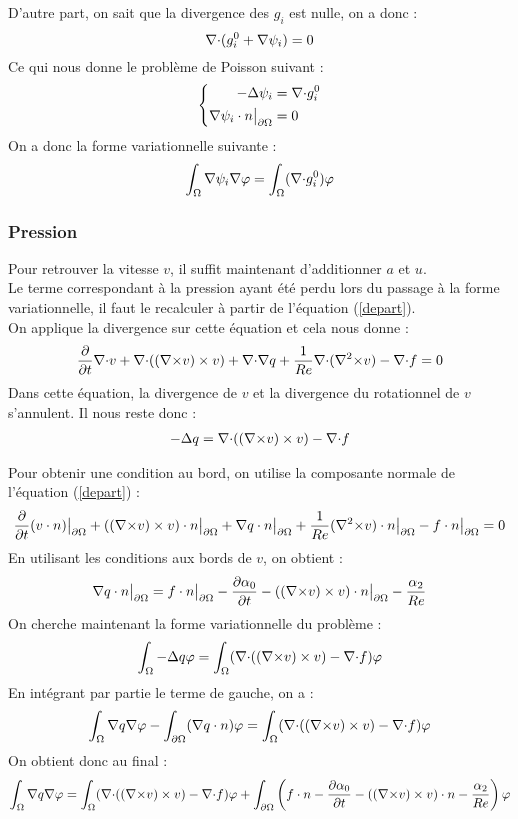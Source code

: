 D'autre part, on sait que la divergence des $g_i$ est nulle, on a donc :
\[
{\nabla\cdot} (g_i^0+{\nabla}\psi_i)=0
\]
Ce qui nous donne le problème de Poisson suivant :
\begin{eqnarray}
\label{psi}
\left\{
\begin{aligned}
-{\Delta}\psi_i &= {\nabla\cdot} g_i^0\\
{\nabla}\psi_i\cdot n{\big\rvert_{\partial\Omega}} &= 0
\end{aligned}
\right.
\end{eqnarray}
On a donc la forme variationnelle suivante :
\begin{eqnarray}
\label{fvpsii}
\int_\Omega {\nabla}\psi_i{\nabla}\varphi = \int_\Omega ({\nabla\cdot} g_i^0)\varphi
\end{eqnarray}

\subsubsection{Pression}
\label{pression}

Pour retrouver la vitesse $v$, il suffit maintenant d'additionner $a$ et $u$.\\
Le terme correspondant à la pression ayant été perdu lors du passage à la forme variationnelle, il faut le recalculer à partir de l'équation (\ref{depart}).\\

On applique la divergence sur cette équation et cela nous donne :
\[
\frac{\partial}{\partial t}{\nabla\cdot} v + {\nabla\cdot}(({\nabla\times} v)\times v) + {\nabla\cdot}{\nabla} q + \frac{1}{Re}{\nabla\cdot}({\nabla^2\times} v) - {\nabla\cdot} f = 0
\]
Dans cette équation, la divergence de $v$ et la divergence du rotationnel de $v$ s'annulent. Il nous reste donc :
\begin{eqnarray}
\label{q}
-{\Delta} q = {\nabla\cdot}(({\nabla\times} v)\times v) - {\nabla\cdot} f
\end{eqnarray}

Pour obtenir une condition au bord, on utilise la composante normale de l'équation (\ref{depart}) :
\[
\frac{\partial}{\partial t}(v\cdot n){\big\rvert_{\partial\Omega}} + (({\nabla\times} v)\times v)\cdot n{\big\rvert_{\partial\Omega}} + {\nabla} q\cdot n{\big\rvert_{\partial\Omega}} +\frac{1}{Re}({\nabla^2\times} v)\cdot n{\big\rvert_{\partial\Omega}} - f\cdot n{\big\rvert_{\partial\Omega}} = 0
\]
En utilisant les conditions aux bords de $v$, on obtient :
\[
{\nabla} q\cdot n{\big\rvert_{\partial\Omega}} =  f\cdot n{\big\rvert_{\partial\Omega}} - \frac{\partial\alpha_0}{\partial t} - (({\nabla\times} v)\times v)\cdot n{\big\rvert_{\partial\Omega}} - \frac{\alpha_2}{Re}
\]
On cherche maintenant la forme variationnelle du problème :
\[
\int_\Omega -{\Delta} q\varphi = \int_\Omega ({\nabla\cdot}(({\nabla\times} v)\times v) -{\nabla\cdot} f)\varphi
\] 
En intégrant par partie le terme de gauche, on a :
\[
\int_\Omega {\nabla} q{\nabla}\varphi - \int_{\partial\Omega} ({\nabla} q\cdot n)\varphi = \int_\Omega ({\nabla\cdot}(({\nabla\times} v)\times v) -{\nabla\cdot} f)\varphi
\]
On obtient donc au final :
\begin{eqnarray}
\label{fvsol}
\int_\Omega {\nabla} q{\nabla}\varphi = \int_\Omega ({\nabla\cdot}(({\nabla\times} v)\times v) -{\nabla\cdot} f)\varphi + \int_{\partial\Omega} \left(f\cdot n - \frac{\partial\alpha_0}{\partial t} - (({\nabla\times} v)\times v)\cdot n - \frac{\alpha_2}{Re}\right)\varphi
\end{eqnarray}

